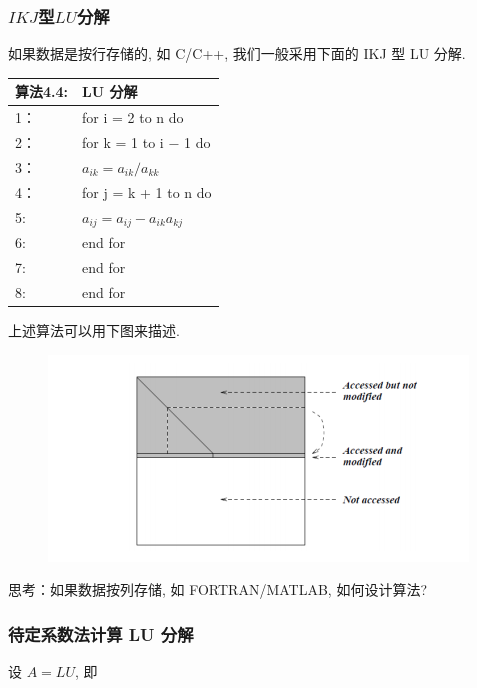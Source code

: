 \documentclass[12pt,a4paper]{article}
\begin{document}
\newpage
\subsubsection{$IKJ$型$LU$分解}
如果数据是按行存储的, 如 C/C++, 我们一般采用下面的 IKJ 型 LU 分解.
\begin{table}  
	\begin{tabular*}{16cm}{ll}  
		\hline  
		算法4.4: & LU 分解 \\  
		\hline  
		1：   &for i = 2 to n do\\  
		2：   &\qquad for k = 1 to i − 1 do\\
		3：   &\qquad \qquad $a_{ik} = a_{ik}/a_{kk}$\\
		4：   &\qquad \qquad for j = k + 1 to n do\\
		5:    &\qquad \qquad \qquad $a_{ij} = a_{ij} − a_{ik}a_{kj}$\\
		6:    &\qquad \qquad end for\\
		7:    &\qquad end for\\
		8:    &end for \\
		\hline  
	\end{tabular*}  
\end{table} 

上述算法可以用下图来描述.

\begin{figure}[h]%
	\centering  %
	\includegraphics[width=0.7\linewidth]{figures/Figure_6.png}  %
	\caption{}  %
	\label{fig:mcmthesis-logo}   %
\end{figure}


思考：如果数据按列存储, 如 FORTRAN/MATLAB, 如何设计算法?	


\subsubsection{待定系数法计算 LU 分解}

设 $A = LU$, 即
\end{document}
